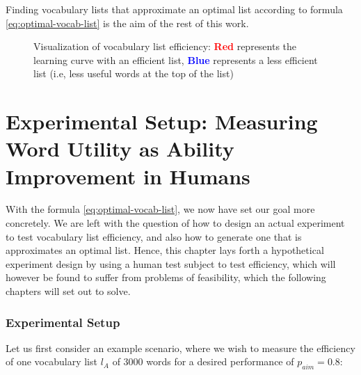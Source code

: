 Finding vocabulary lists that approximate an optimal list according to formula \ref{eq:optimal-vocab-list} is the aim of the rest of this work.

\begin{figure}[H]
	\centering
	\caption{Visualization of vocabulary list efficiency: \textbf{\textcolor{red}{Red}} represents the learning curve with an efficient list, \textbf{\textcolor{blue}{Blue}} represents a less efficient list (i.e, less useful words at the top of the list)}
	\label{fig:voc-list-efficiency}
\end{figure}

\section{Experimental Setup: Measuring Word Utility as Ability Improvement in Humans} \label{sec:human-efficiency-testing}


With the formula \ref{eq:optimal-vocab-list}, we now have set our goal more concretely.
We are left with the question of how to design an actual experiment to test vocabulary list efficiency, and also how to generate one that is approximates an optimal list.
Hence, this chapter lays forth a hypothetical experiment design by using a human test subject to test efficiency, which will however be found to suffer from problems of feasibility, which the following chapters will set out to solve.

\subsubsection{Experimental Setup}
Let us first consider an example scenario, where we wish to measure the efficiency of one vocabulary list $l_A$ of 3000 words for a desired performance of $p_{aim} = 0.8$:


